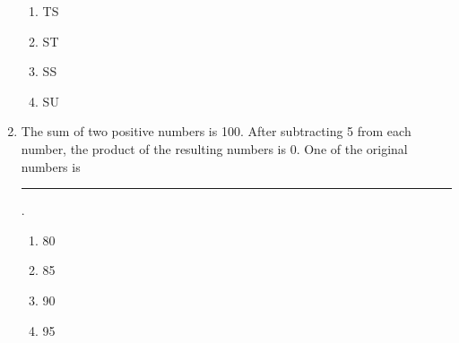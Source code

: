 \documentclass[journal]{IEEEtran}
\numberwithin{equation}{enumi}
\numberwithin{figure}{enumi}
\begin{document}
\begin{enumerate}
	\begin{enumerate}         
                \item TS
                \item ST
                \item SS
                \item SU
        \end{enumerate}
\item The sum of two positive numbers is 100. After subtracting 5 from each number, the product of the resulting numbers is 0. One of the original numbers is \rule{1cm}{0.4pt}.
	\begin{enumerate}
                \item 80       
                \item 85       
                \item 90       
                \item 95       
        \end{enumerate}

\end{enumerate}
\end{document}
